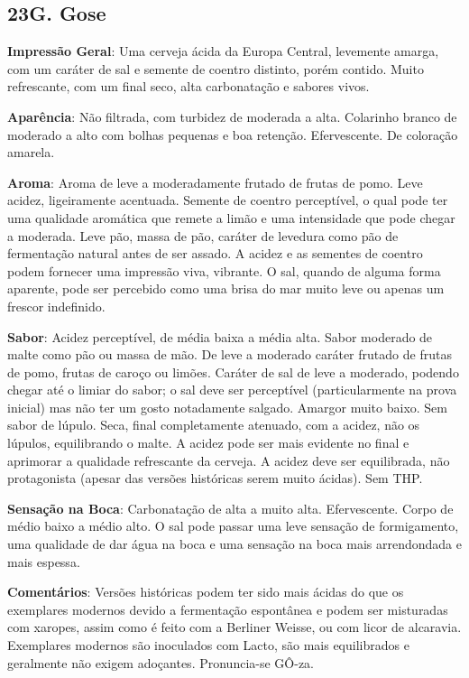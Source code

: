 \subsection*{23G. Gose}
\textbf{Impressão Geral}: Uma cerveja ácida da Europa Central, levemente amarga, com um caráter de sal e semente de coentro distinto, porém contido. Muito refrescante, com um final seco, alta carbonatação e sabores vivos.

\textbf{Aparência}: Não filtrada, com turbidez de moderada a alta. Colarinho branco de moderado a alto com bolhas pequenas e boa retenção. Efervescente. De coloração amarela.

\textbf{Aroma}: Aroma de leve a moderadamente frutado de frutas de pomo. Leve acidez, ligeiramente acentuada. Semente de coentro perceptível, o qual pode ter uma qualidade aromática que remete a limão e uma intensidade que pode chegar a moderada. Leve pão, massa de pão, caráter de levedura como pão de fermentação natural antes de ser assado. A acidez e as sementes de coentro podem fornecer uma impressão viva, vibrante. O sal, quando de alguma forma aparente, pode ser percebido como uma brisa do mar muito leve ou apenas um frescor indefinido.

\textbf{Sabor}: Acidez perceptível, de média baixa a média alta. Sabor moderado de malte como pão ou massa de mão. De leve a moderado caráter frutado de frutas de pomo, frutas de caroço ou limões. Caráter de sal de leve a moderado, podendo chegar até o limiar do sabor; o sal deve ser perceptível (particularmente na prova inicial) mas não ter um gosto notadamente salgado. Amargor muito baixo. Sem sabor de lúpulo. Seca, final completamente atenuado, com a acidez, não  os lúpulos, equilibrando o malte. A acidez pode ser mais evidente no final e aprimorar a qualidade refrescante da cerveja. A acidez deve ser equilibrada, não protagonista (apesar das versões históricas serem muito ácidas). Sem THP.

\textbf{Sensação na Boca}: Carbonatação de alta a muito alta. Efervescente. Corpo de médio baixo a médio alto. O sal pode passar uma leve sensação de formigamento, uma qualidade de dar água na boca e uma sensação na boca mais arrendondada e mais espessa.

\textbf{Comentários}: Versões históricas podem ter sido mais ácidas do que os exemplares modernos devido a fermentação espontânea e podem ser misturadas com xaropes, assim como é feito com a Berliner Weisse, ou com licor de alcaravia. Exemplares modernos são inoculados com Lacto, são mais equilibrados e geralmente não exigem adoçantes. Pronuncia-se GÔ-za.

